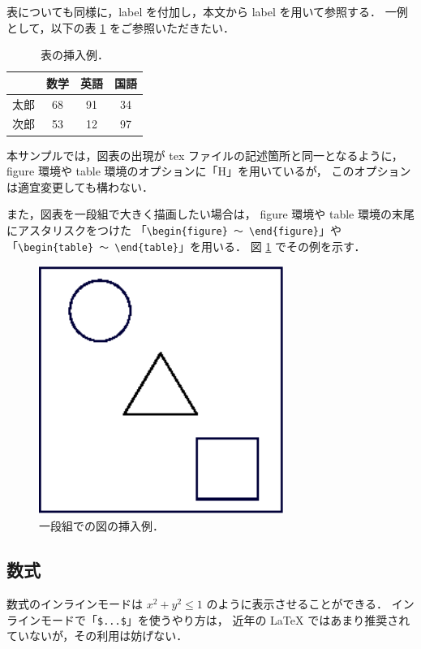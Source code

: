 表についても同様に，label を付加し，本文から label を用いて参照する．
一例として，以下の表 \ref{tab:sample} をご参照いただきたい．

\begin{table}[H]
 \caption{\small{表の挿入例．}}
 \centering
 \begin{tabular}{|c|c|c|c|}
	\hline
		& 数学	& 英語	& 国語	\\ \hline
	太郎	& 68	& 91	& 34	\\
	次郎	& 53	& 12	& 97	\\ \hline
 \end{tabular}
 \label{tab:sample}
\end{table}

本サンプルでは，図表の出現が tex ファイルの記述箇所と同一となるように，
figure 環境や table 環境のオプションに「H」を用いているが，
このオプションは適宜変更しても構わない．

また，図表を一段組で大きく描画したい場合は，
figure 環境や table 環境の末尾にアスタリスクをつけた
「\verb+\begin{figure} 〜 \end{figure}+」や
「\verb+\begin{table} 〜 \end{table}+」を用いる．
図 \ref{fig:sample-big} でその例を示す．

\begin{figure}[ht]
 \centering
 \includegraphics[width=80mm]{fig-sample.eps}
 \caption{\small{一段組での図の挿入例．}}
 \label{fig:sample-big}
\end{figure}

\subsection{数式}
数式のインラインモードは \(x^2 + y^2 \leq 1\) のように表示させることができる．
インラインモードで「\verb+$...$+」を使うやり方は，
近年の LaTeX ではあまり推奨されていないが，その利用は妨げない．

